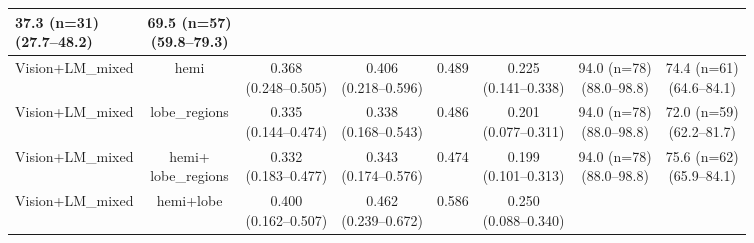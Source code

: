 \documentclass[FCD_GNN.tex]{subfiles}
\begin{document}
\begin{table}[ht]
\begin{tabular}{lccccccc}
    \makecell{37.3 (n=31) \\ (27.7--48.2)} &
    \makecell{69.5 (n=57) \\ (59.8--79.3)} \\
    \hline
    Vision+LM\_mixed & 
    hemi &
    \makecell{\colorbox{orange!15}{0.368} \\ (0.248--0.505)} &
    \makecell{\colorbox{orange!15}{0.406} \\ (0.218--0.596)} &
    \colorbox{cyan!15}{0.489} &
    \makecell{\colorbox{orange!15}{0.225} \\ (0.141--0.338)} &
    \makecell{94.0 (n=78) \\ (88.0--98.8)} &
    \makecell{\colorbox{orange!15}{74.4 (n=61)} \\ (64.6--84.1)} \\
    \hline
    Vision+LM\_mixed & 
    lobe\_regions &
    \makecell{0.335 \\ (0.144--0.474)} &
    \makecell{0.338 \\ (0.168--0.543)} &
    \colorbox{orange!15}{0.486} &
    \makecell{0.201 \\ (0.077--0.311)} &
    \makecell{94.0 (n=78) \\ (88.0--98.8)} &
    \makecell{72.0 (n=59) \\ (62.2--81.7)} \\
    \hline
    Vision+LM\_mixed & 
    \makecell{hemi+ \\lobe\_regions} &
    \makecell{0.332 \\ (0.183--0.477)} &
    \makecell{0.343 \\ (0.174--0.576)} &
    0.474 &
    \makecell{0.199 \\ (0.101--0.313)} &
    \makecell{94.0 (n=78) \\ (88.0--98.8)} &
    \makecell{\colorbox{cyan!15}{75.6 (n=62)} \\ (65.9--84.1)} \\
    \hline
    Vision+LM\_mixed & 
    hemi+lobe &
    \makecell{\colorbox{green!15}{0.400} \\ (0.162--0.507)} &
    \makecell{\colorbox{green!15}{0.462} \\ (0.239--0.672)} &
    \colorbox{green!15}{0.586} &
    \makecell{\colorbox{green!15}{0.250} \\ (0.088--0.340)} &

\end{tabular}
\end{table}
\end{document}
